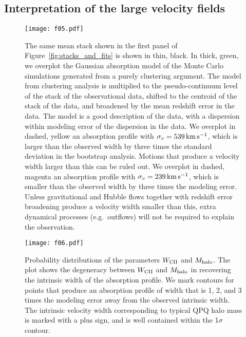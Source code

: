 \documentclass[iop]{emulateapj}
\begin{document}
\subsection{Interpretation of the large velocity fields}
\label{sec:significance_width}

\begin{figure}
\texttt{[image: f05.pdf]}
\caption{The same  mean stack shown in the first panel of 
Figure~\ref{fig:stacks_and_fits} is shown in thin, black. In thick, green, we overplot the 
Gaussian absorption model of the Monte Carlo simulations generated from a purely clustering 
argument. The model from clustering analysis is multiplied to the pseudo-continuum level of the 
stack of the observational data, shifted to the centroid of the stack of the data, and broadened 
by the mean redshift error in the data. The model is a good description of the data, with a 
dispersion within modeling error of the dispersion in the data. We overplot in dashed, yellow an 
absorption profile with $\sigma_v=539\,{\rm km\,s^{-1}}$, which is larger than the observed width 
by three times the standard deviation in the bootstrap analysis. Motions that produce a velocity 
width larger than this can be ruled out. We overplot in dashed, magenta an absorption profile with 
$\sigma_v=239\,{\rm km\,s^{-1}}$, which is smaller than the observed width by three times the
modeling error. Unless gravitational and Hubble flows together with redshift error broadening 
produce a velocity width smaller than this, extra dynamical processes (e.g.\ outflows) will not be 
required to explain the observation. 
}
\label{fig:monte}
\end{figure}

\begin{figure}
\texttt{[image: f06.pdf]}
\caption{
Probability distributions of the parameters $W_{\rm CII}$ and $M_{\rm halo}$. The plot shows the 
degeneracy between $W_{\rm CII}$ and $M_{\rm halo}$ in recovering the intrinsic width of the 
absorption profile. We mark contours for points that produce an absorption 
profile of width that is 1, 2, and 3 times the modeling error away from the observed intrinsic 
width. The intrinsic velocity width corresponding to typical QPQ halo mass is marked with a plus 
sign, and is well contained within the 1$\sigma$ contour.}
\label{fig:contour}
\end{figure}
\end{document}
